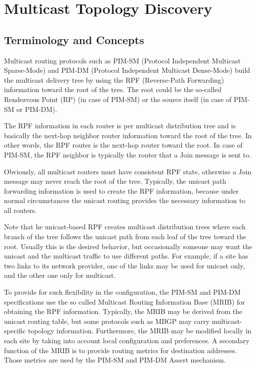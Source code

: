 %
%

\chapter{Multicast Topology Discovery}

\section{Terminology and Concepts}

Multicast routing protocols such as PIM-SM (Protocol Independent
Multicast Sparse-Mode) and PIM-DM (Protocol Independent Multicast
Dense-Mode) build the multicast delivery tree by using the RPF
(Reverse-Path Forwarding) information toward the root of the tree.
The root could be the so-called Rendezvous Point (RP) (in case of
PIM-SM) or the source itself (in case of PIM-SM or PIM-DM).

The RPF information in each router is per multicast distribution tree
and is basically the next-hop neighbor router information toward the
root of the tree. In other words, the RPF router is the next-hop router
toward the root. In case of PIM-SM, the RPF neighbor is typically the
router that a Join message is sent to.

Obviously, all multicast routers must have consistent RPF state,
otherwise a Join message may never reach the root of the tree.
Typically, the unicast path forwarding information is used to create the
RPF information, because under normal circumstances the unicast routing
provides the necessary information to all routers.

Note that he unicast-based RPF creates multicast distribution trees
where each branch of the tree follows the unicast path from each leaf of
the tree toward the root. Usually this is the desired behavior, but
occasionally someone may want the unicast and the multicast traffic to
use different paths. For example, if a site has two links to its network
provider, one of the links may be used for unicast only, and the other
one only for multicast.

To provide for such flexibility in the configuration, the PIM-SM and
PIM-DM specifications use the so called Multicast Routing Information
Base (MRIB) for obtaining the RPF information.
Typically, the MRIB may be derived from the unicast routing table, but
some protocols such as MBGP may carry multicast-specific topology
information. Furthermore, the MRIB may be modified locally in each site
by taking into account local configuration and preferences.
A secondary function of the MRIB is to provide routing metrics for
destination addresses. Those metrics are used by the PIM-SM and PIM-DM
Assert mechanism.

